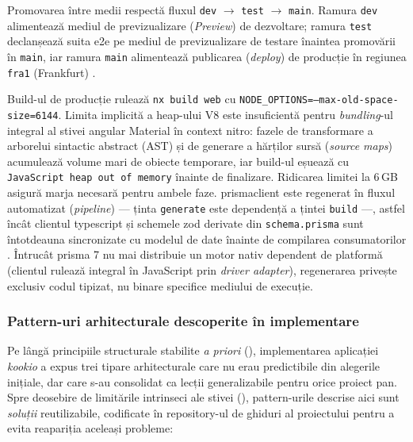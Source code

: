 Promovarea între medii respectă fluxul \texttt{dev} \(\rightarrow\) \texttt{test} \(\rightarrow\) \texttt{main}. Ramura \texttt{dev} alimentează mediul de previzualizare (\textit{Preview}) de dezvoltare; ramura \texttt{test} declanșează suita \acrshort{e2e} pe mediul de previzualizare de testare înaintea promovării în \texttt{main}, iar ramura \texttt{main} alimentează publicarea (\textit{deploy}) de producție în regiunea \texttt{fra1} (Frankfurt) \cite{vercel_cli}.

Build-ul de producție rulează \texttt{nx build web} cu \texttt{NODE\_OPTIONS=\allowbreak --max-old-space-size=6144}.
Limita implicită a heap-ului V8 este insuficientă pentru \textit{bundling}-ul integral al stivei \gls{angular} Material în context \gls{nitro}: fazele de transformare a arborelui sintactic abstract (AST) și de generare a hărților sursă (\textit{source maps}) acumulează volume mari de obiecte temporare, iar build-ul eșuează cu \texttt{JavaScript heap out of memory} înainte de finalizare.
Ridicarea limitei la 6\,GB asigură marja necesară pentru ambele faze.
\gls{prismaclient} este regenerat în fluxul automatizat (\textit{pipeline}) --- ținta \texttt{generate} este dependență a țintei \texttt{build} ---, astfel încât clientul \gls{typescript} și schemele \gls{zod} derivate din \texttt{schema.prisma} sunt întotdeauna sincronizate cu modelul de date înainte de compilarea consumatorilor \cite{prisma_orm}. Întrucât \gls{prisma} 7 nu mai distribuie un motor nativ dependent de platformă (clientul rulează integral în JavaScript prin \textit{driver adapter}), regenerarea privește exclusiv codul tipizat, nu binare specifice mediului de execuție.

\subsubsection{Pattern-uri arhitecturale descoperite în implementare}\label{subsec:pan-patterns}

Pe lângă principiile structurale stabilite \textit{a priori} (), implementarea aplicației \textit{\gls{kookio}} a expus trei tipare arhitecturale care nu erau predictibile din alegerile inițiale, dar care s-au consolidat ca lecții generalizabile pentru orice proiect \gls{pan}. Spre deosebire de limitările intrinseci ale stivei (), pattern-urile descrise aici sunt \textit{soluții} reutilizabile, codificate în repository-ul de ghiduri al proiectului pentru a evita reapariția aceleași probleme:

